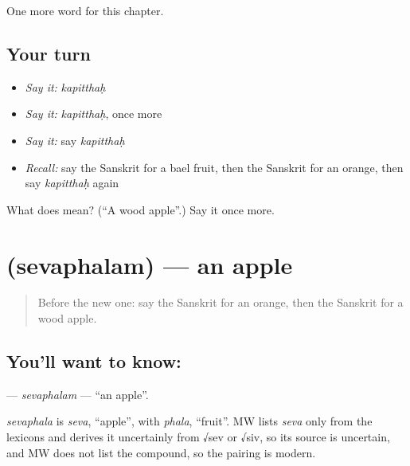 \begin{grammarlens}[title={What you've built}]
One more word for this chapter.
\end{grammarlens}

\subsection*{Your turn}
\begin{itemize}
\raggedright
  \item \emph{Say it:} \emph{kapitthaḥ}
  \item \emph{Say it:} \emph{kapitthaḥ}, once more
  \item \emph{Say it:} say \emph{kapitthaḥ}
  \item \emph{Recall:} say the Sanskrit for a bael fruit, then the Sanskrit for an orange, then say \emph{kapitthaḥ} again
\end{itemize}

\begin{tcolorbox}[breakable,colback=teal!4,colframe=teal!35!black,title={Before you move on}]
What does  mean? (\textquotedblleft{}A wood apple\textquotedblright{}.) Say it once more.
\end{tcolorbox}
\section[\texorpdfstring{\sk{सेवफलम्} (sevaphalam)}{सेवफलम् (sevaphalam)}]{ (sevaphalam) — an apple}

\label{lesson:SA-C219-sevaphalam}



\begin{quote}
Before the new one: say the Sanskrit for an orange, then the Sanskrit for a wood apple.
\end{quote}

\subsection*{You'll want to know: }
\textbf{} — \emph{sevaphalam} — \textquotedblleft{}an apple\textquotedblright{}.

\begin{cousinweb}
\emph{sevaphala} is \emph{seva}, \textquotedblleft{}apple\textquotedblright{}, with \emph{phala}, \textquotedblleft{}fruit\textquotedblright{}. MW lists \emph{seva} only from the lexicons and derives it uncertainly from √sev or √siv, so its source is uncertain, and MW does not list the compound, so the pairing is modern.
\end{cousinweb}

